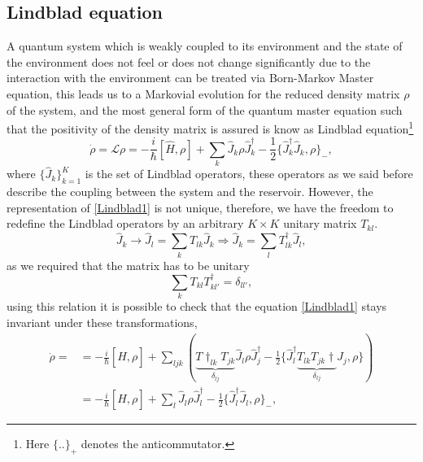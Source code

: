 \begin{appendix}
\chapter{Lindblad equation}\label{Lindbladappendix}
A quantum system which is weakly coupled to its environment and the state of the environment does not feel or does not change significantly due to the interaction with the environment can be treated via Born-Markov Master equation, this leads us to a Markovial evolution for the reduced density matrix $\rho$ of the system, and the most general form of the quantum master equation such that the positivity of the density matrix is assured is know as Lindblad equation\footnote{Here $\{..\}_{+}$ denotes the anticommutator. }
\begin{equation}
\dot{\rho}=\mathcal{L}\rho=-\frac{i}{\hbar}[\hat{H},\rho]+\sum_{k}\hat{J}_{k}\rho\hat{J}_{k}^{\dagger}-\frac{1}{2}\{\hat{J}^{\dagger}_{k}\hat{J}_{k},\rho\}_{-},
\label{Lindblad1}
\end{equation} 
where $\{\hat{J}_{k}\}_{k=1}^{K}$ is the set of Lindblad operators, these operators as we said before describe the coupling between the system and the reservoir. However, the representation of \eqref{Lindblad1} is not unique, therefore, we have the freedom to redefine the Lindblad operators by an arbitrary $K\times K$ unitary matrix $T_{kl}$\cite{0305-4470-26-9-019}.
\begin{equation}
\hat{J}_{k}\rightarrow\hat{J}_{l}=\sum_{k}T_{lk}\hat{J}_{k}\Rightarrow \hat{J}_{k}=\sum_{l}T_{lk}^{\dagger}\hat{J}_{l},
\label{Lindblad2}
\end{equation} 
as we required that the matrix has to be unitary
\[\sum_{k}T_{kl}T^{\dagger}_{kl'}=\delta_{ll'},\]
using this relation it is possible to check that the equation \eqref{Lindblad1} stays invariant under these transformations,
\begin{align}
\dot{\rho}=&=-\frac{i}{\hbar}[\hat{H},\rho]+\sum_{ljk}\left(\underbrace{T{\dagger}_{lk}T_{jk}}_{\delta_{lj}}\hat{J}_{l}\rho\hat{J}_{j}^{\dagger}-\frac{1}{2}\{\hat{J}^{\dagger}_{l}\underbrace{T_{lk}T_{jk}{\dagger}}_{\delta_{lj}}\hat{J}_{j},\rho\}\right)\nonumber\\
&=-\frac{i}{\hbar}[\hat{H},\rho]+\sum_{l}\hat{J}_{l}\rho\hat{J}_{l}^{\dagger}-\frac{1}{2}\{\hat{J}^{\dagger}_{l}\hat{J}_{l},\rho\}_{-},\label{Lindblad3}
\end{align} 


\end{appendix}
